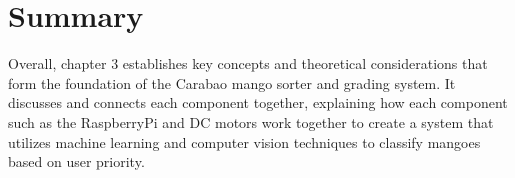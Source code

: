 
\section{Summary}

Overall, chapter 3 establishes key concepts and theoretical considerations that form the foundation of the Carabao mango sorter and grading system. It discusses and connects each component together, explaining how each component such as the RaspberryPi and DC motors work together to create a system that utilizes machine learning and computer vision techniques to classify mangoes based on user priority.